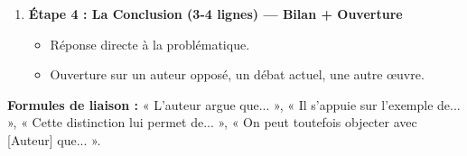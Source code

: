 \documentclass[11pt]{article}
\newcommand{\cle}[1]{{\popxbold\color{popdark}#1}}
\begin{document}
\begin{methode}
\begin{enumerate}
\begin{itemize}
        \item Résumer la démonstration globale.
        \item Situer dans l'œuvre / le courant / l'histoire des idées.
        \item \textbf{Évaluation critique (Mesurée) :} Force de l'argumentation ? Limites ? Objections possibles (auteurs contraires) ? Actualité ?
    \end{itemize}
    \item \textbf{Étape 4 : La Conclusion (3-4 lignes) — \cle{Bilan + Ouverture}}
    \begin{itemize}
        \item Réponse directe à la problématique.
        \item Ouverture sur un auteur opposé, un débat actuel, une autre œuvre.
    \end{itemize}
\end{enumerate}
\textbf{Formules de liaison :} « L'auteur argue que... », « Il s'appuie sur l'exemple de... », « Cette distinction lui permet de... », « On peut toutefois objecter avec [Auteur] que... ».
\end{methode}
\end{document}
